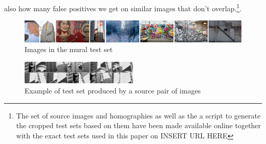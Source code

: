 \documentclass[12pt,journal,compsoc]{IEEEtran}
\begin{document}
also how many false positives we get on similar images that don't 
overlap.\footnote{The set of source images and homographies as well as 
	the a script to generate the cropped test sets based on them have 
	been made available online together with the exact test sets used in 
this paper on INSERT URL HERE}.
%
\begin{figure}
	\centering
	\includegraphics[width=\textwidth]{images/murals}
	\caption{Images in the mural test set}
	\label{fig:mural}
\end{figure}
%
\begin{figure}
	\centering
	\includegraphics[width=0.5\textwidth]{images/crop_examples}
	\caption{Example of test set produced by a source pair of images}
	\label{fig:fairey}
\end{figure}
%
\end{document}
